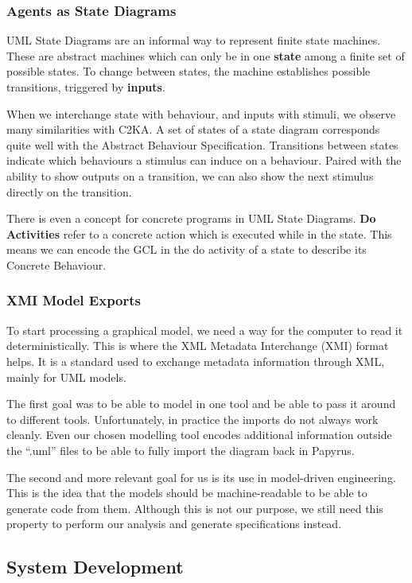 \subsubsection{Agents as State Diagrams}\label{subsubsec:diagram-agents}
UML State Diagrams are an informal way to represent finite state machines.
These are abstract machines which can only be in one \textbf{state} among a finite set of possible states.
To change between states, the machine establishes possible transitions, triggered by \textbf{inputs}.

When we interchange state with behaviour, and inputs with stimuli, we observe many similarities with C2KA\@.
A set of states of a state diagram corresponds quite well with the Abstract Behaviour Specification.
Transitions between states indicate which behaviours a stimulus can induce on a behaviour.
Paired with the ability to show outputs on a transition, we can also show the next stimulus directly on the transition.

There is even a concept for concrete programs in UML State Diagrams.
\textbf{Do Activities} refer to a concrete action which is executed while in the state.
This means we can encode the GCL in the do activity of a state to describe its Concrete Behaviour.

\subsubsection{XMI Model Exports}
To start processing a graphical model, we need a way for the computer to read it deterministically.
This is where the XML Metadata Interchange (XMI) format helps.
It is a standard used to exchange metadata information through XML, mainly for UML models.

The first goal was to be able to model in one tool and be able to pass it around to different tools.
Unfortunately, in practice the imports do not always work cleanly.
Even our chosen modelling tool encodes additional information outside the ``.uml'' files to be able to fully import the diagram back in Papyrus.

The second and more relevant goal for us is its use in model-driven engineering.
This is the idea that the models should be machine-readable to be able to generate code from them.
Although this is not our purpose, we still need this property to perform our analysis and generate specifications instead.

\subsection{System Development}
\label{subsec:system-development}
